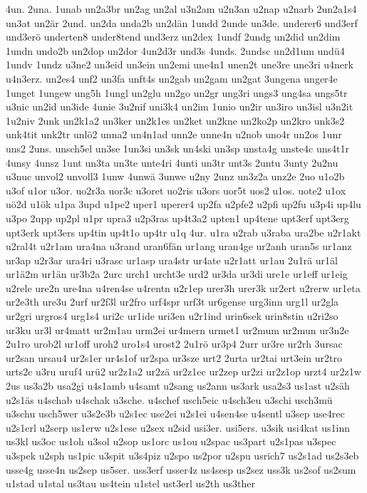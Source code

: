 {4un.
2una.
1unab
un2a3br
un2ag
un2al
u3n2am
u2n3an
u2nap
u2narb
2un2a1s4
un3at
un2är
2und.
un2da
unda2b
un2dän
1undd
2unde
un3de.
underer6
und3erf
und3erö
underten8
under8tend
und3erz
un2dex
1undf
2undg
un2did
un2dim
1undn
undo2b
un2dop
un2dor
4un2d3r
und3s
4unds.
2undsc
un2d1um
undü4
1undv
1undz
u3ne2
un3eid
un3ein
un2emi
une4n1
unen2t
une3re
une3ri
u4nerk
u4n3erz.
un2es4
unf2
un3fa
unft4s
un2gab
un2gam
un2gat
3ungena
unger4e
1unget
1ungew
ung5h
1ungl
un2glu
un2go
un2gr
ung3ri
ungs3
ung4sa
ungs5tr
u3nic
un2id
un3ide
4unie
3u2nif
uni3k4
un2im
1unio
un2ir
un3iro
un3isl
u3n2it
1u2niv
2unk
un2k1a2
un3ker
un2k1es
un2ket
un2kne
un2ko2p
un2kro
unk3s2
unk4tit
unk2tr
unlö2
unna2
un4n1ad
unn2e
unne4n
u2nob
uno4r
un2os
1unr
uns2
2uns.
unsch5el
un3se
1un3si
un3sk
un4ski
un3sp
unsta4g
unste4c
uns4t1r
4unsy
4unsz
1unt
un3ta
un3te
unte4ri
4unti
un3tr
unt3s
2untu
3unty
2u2nu
u3nuc
unvol2
unvoll3
1unw
4unwä
3unwe
u2ny
2unz
un3z2a
unz2e
2uo
u1o2b
u3of
u1or
u3or.
uo2r3a
uor3c
u3oret
uo2ris
u3ors
uor5t
uos2
u1os.
uote2
u1ox
uö2d
u1ök
u1pa
3upd
u1pe2
uper1
uperer4
up2fa
u2pfe2
u2pfi
up2fu
u3p4i
up4lu
u3po
2upp
up2pl
u1pr
upra3
u2p3ras
up4t3a2
upten1
up4tene
upt3erf
upt3erg
upt3erk
upt3ers
up4tin
up4t1o
up4tr
u1q
4ur.
u1ra
u2rab
u3raba
ura2be
u2r1akt
u2ral4t
u2r1am
ura4na
u3rand
uran6fän
ur1ang
uran4ge
ur2anh
uran5s
ur1anz
ur3ap
u2r3ar
ura4ri
u3rasc
ur1asp
ura4str
ur4ate
u2r1att
ur1au
2u1rä
ur1äl
ur1ä2m
ur1än
ur3b2a
2urc
urch1
urcht3e
urd2
ur3da
ur3di
ure1e
ur1eff
ur1eig
u2rele
ure2n
ure4na
u4ren4se
u4rentn
u2r1ep
urer3h
urer3k
ur2ert
u2rerw
ur1eta
ur2e3th
ure3u
2urf
ur2f3l
ur2fro
urf4spr
urf3t
ur6gense
urg3inn
urg1l
ur2gla
ur2gri
urgros4
urg1s4
uri2c
ur1ide
uri3en
u2r1ind
urin6sek
urin8stin
u2ri2so
ur3ku
ur3l
ur4matt
ur2m1au
urm2ei
ur4mern
urmet1
ur2mum
ur2mun
ur3n2e
2u1ro
urob2l
ur1off
uroh2
uro1s4
urost2
2u1rö
ur3p4
2urr
ur3re
ur2rh
3ursac
ur2san
ursau4
ur2s1er
ur4s1of
ur2spa
ur3sze
urt2
2urta
ur2tai
urt3ein
ur2tro
urts2c
u3ru
uruf4
urü2
ur2z1a2
ur2zä
ur2z1ec
ur2zep
ur2zi
ur2z1op
urzt4
ur2z1w
2us
us3a2b
usa2gi
u4s1amb
u4samt
u2sang
us2ann
us3ark
usa2s3
us1ast
u2säh
u2s1äs
u4schab
u4schak
u3sche.
u4schef
usch5eic
u4sch3eu
u3schi
usch3mü
u3schu
usch5wer
u3s2e3b
u2s1ec
use2ei
u2s1ei
u4sen4se
u4sentl
u3sep
use4rec
u2s1erl
u2serp
us1erw
u2s1ese
u2sex
u2sid
usi3er.
usi5ers.
u3sik
usi4kat
us1inn
us3kl
us3oc
us1oh
u3sol
u2sop
us1orc
us1ou
u2spac
us3part
u2s1pas
u3spec
u3spek
u2sph
us1pic
u3spit
u3s4piz
u2spo
us2por
u2spu
usrich7
us2s1ad
us2s3eb
usse4g
usse4n
us2sep
us5ser.
uss3erf
usser4z
us4sesp
us2sez
uss3k
us2sof
us2sum
u1stad
u1stal
us3tau
us4tein
u1stel
ust3erl
us2th
us3ther
}

